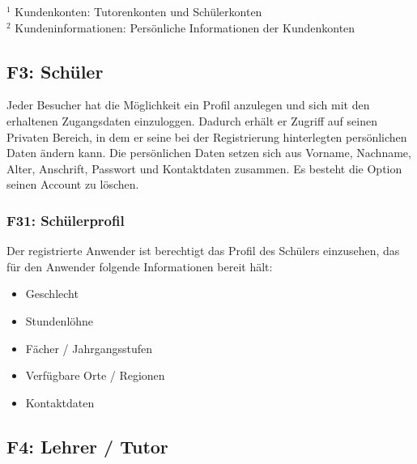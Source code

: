 \documentclass[10pt,a4paper]{scrartcl}
\begin{document}
\bigskip

$^1$ Kundenkonten: Tutorenkonten und Schülerkonten\\
$^2$ Kundeninformationen: Persönliche Informationen der Kundenkonten




\subsection{F3: Schüler}
Jeder Besucher hat die Möglichkeit ein Profil anzulegen und sich mit den erhaltenen Zugangsdaten einzuloggen.
Dadurch erhält er Zugriff auf seinen Privaten Bereich, in dem er seine bei der Registrierung hinterlegten persönlichen Daten ändern kann.
Die persönlichen Daten setzen sich aus Vorname, Nachname, Alter, Anschrift, Passwort und Kontaktdaten zusammen.
Es besteht die Option seinen Account zu löschen.

%

\subsubsection*{F31: Schülerprofil}

Der registrierte Anwender ist berechtigt das Profil des Schülers einzusehen, das für den Anwender folgende Informationen bereit hält:

\begin{itemize}
	\item Geschlecht
	\item Stundenlöhne
	\item Fächer / Jahrgangsstufen
	\item Verfügbare Orte / Regionen
	\item Kontaktdaten
\end{itemize}



\subsection{F4: Lehrer / Tutor}
\end{document}
